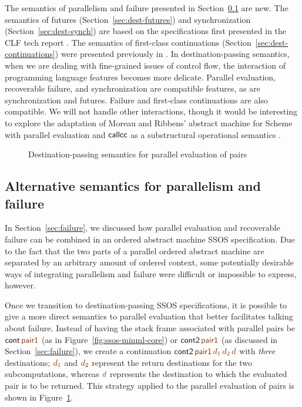 The semantics of parallelism and failure presented in
Section~\ref{sec:modular-parallelism} are new. The semantics of
futures (Section~\ref{sec:dest-futures}) and synchronization
(Section~\ref{sec:dest-synch}) are based on the specifications first
presented in the CLF tech report \cite{cervesato02concurrent}. The
semantics of first-class continuations
(Section~\ref{sec:dest-continuations}) were presented previously in
\cite{pfenning04substructural,pfenning09substructural}. In
destination-passing semantics, when we are dealing with fine-grained
issues of control flow, the interaction of programming language
features becomes more delicate.  Parallel evaluation, recoverable
failure, and synchronization are compatible features, as are
synchronization and futures. Failure and first-class continuations are
also compatible. We will not handle other interactions, though it
would be interesting to explore the adaptation of Moreau and Ribbens'
abstract machine for Scheme with parallel evaluation and ${\sf
  callcc}$ as a substructural operational semantics
\cite{moreau96semantics}.

\begin{figure}
\caption{Destination-passing semantics for parallel evaluation of pairs}
\label{fig:dest-pair}
\end{figure}

\subsection{Alternative semantics for parallelism and failure}
\label{sec:modular-parallelism}

In Section~\ref{sec:failure}, we discussed how parallel evaluation and
recoverable failure can be combined in an ordered abstract machine
SSOS specification. Due to the fact that the two parts of a parallel
ordered abstract machine are separated by an arbitrary amount of
ordered context, some potentially desirable ways of
integrating parallelism and failure were difficult or impossible to
express, however. 

Once we transition to destination-passing SSOS specifications, it is
possible to give a more direct semantics to parallel evaluation that
better facilitates talking about failure. Instead of having the stack
frame associated with parallel pairs be ${\sf cont}\,\lf{\sf pair1}$ (as
in Figure~\ref{fig:ssos-minml-core}) or ${\sf cont2}\,\lf{\sf pair1}$ (as
discussed in Section~\ref{sec:failure}), we create a continuation
${\sf cont2}\,\lf{\sf pair1}\,\lf{d_1}\,\lf{d_2}\,\lf{d}$ 
with {\it three} destinations;
$\lf{d_1}$ and $\lf{d_2}$ represent the return destinations for the two
subcomputations, whereas $\lf{d}$ represents the destination to which the
evaluated pair is to be returned. This strategy applied to the
parallel evaluation of pairs is shown in Figure~\ref{fig:dest-pair}.

